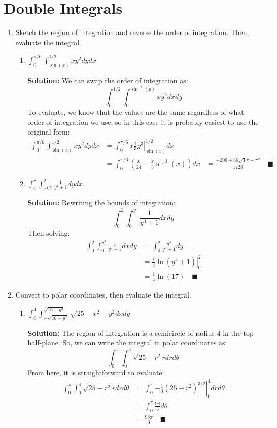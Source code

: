 \documentclass[letterpaper, 11pt]{article}
\begin{document}
\section{Double Integrals}

\begin{enumerate}
\item Sketch the region of integration and reverse the order of integration. Then, evaluate the integral.  
\begin{enumerate}[label=(\alph*)]
\item $\int_0^{\pi/6} \int_{\sin(x)}^{1/2} xy^2 dy dx$
\par \textbf{Solution:} We can swap the order of integration as:
\[ \int_0^{1/2} \int_0^{\sin^{-1}(y)} xy^2 dx dy \]
To evaluate, we know that the values are the same regardless of what order of integration we use, so in this case it is probably easiest to use the original form:
\begin{align*}
\int_0^{\pi/6} \int_{\sin(x)}^{1/2} xy^2 dy dx &= \int_0^{\pi/6} x \left. \frac{1}{3} y^3 \right|_{\sin(x)}^{1/2} dx \\
&= \int_0^{\pi/6} \left( \frac{x}{24} - \frac{x}{3} \sin^3(x) \right) dx 
&= \frac{ -200 + 36 \sqrt{3} \pi + \pi^2}{1728} \quad\blacksquare
\end{align*}


\item $\int_0^8 \int_{x^{1/3}}^2 \frac{ 1}{y^4 + 1}dydx$
\par \textbf{Solution:} Rewriting the bounds of integration:
\[ \int_0^2 \int_0^{y^3} \frac{ 1}{y^4 + 1}dxdy \]
Then solving:
\begin{align*}
\int_0^2 \int_0^{y^3} \frac{ 1}{y^4 + 1}dxdy &= \int_0^2 \frac{ y^3}{y^4 + 1} dy \\
&= \left. \frac{1}{4} \ln(y^4 + 1)\right|_0^2 \\
&= \frac{1}{4} \ln(17) \quad\blacksquare
\end{align*}

\end{enumerate}

\item Convert to polar coordinates, then evaluate the integral. 
\begin{enumerate}[label=(\alph*)]
\item $\int_0^4 \int_{-\sqrt{16-y^2}}^{\sqrt{16-y^2}} \sqrt{ 25 - x^2 - y^2} dx dy$
\par \textbf{Solution:} The region of integration is a semicircle of radius 4 in the top half-plane. So, we can write the integral in polar coordinates as:
\[ \int_0^{\pi} \int_0^4 \sqrt{ 25 - r^2} r dr d\theta \]
From here, it is straightforward to evaluate:
\begin{align*}
\int_0^{\pi} \int_0^4 \sqrt{ 25 - r^2} r dr d\theta  &= \int_0^{\pi} \left. -\frac{1}{3} ( 25 - r^2)^{3/2} \right|_0^4 dr d\theta \\
&= \int_0^\pi \frac{98}{3} d\theta \\
&= \frac{98\pi}{3} \quad\blacksquare
\end{align*}



\end{enumerate}
\end{enumerate}
\end{document}
